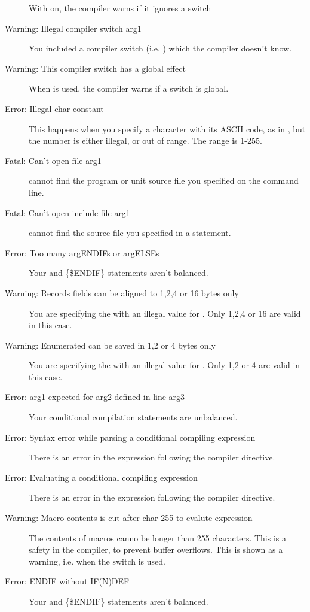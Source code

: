 \begin{description}
 With  on, the compiler warns if it ignores a switch
\item [Warning: Illegal compiler switch arg1]
 You included a compiler switch (i.e. ) which the compiler
 doesn't know.
\item [Warning: This compiler switch has a global effect]
 When  is used, the compiler warns if a switch is global.
\item [Error: Illegal char constant]
 This happens when you specify a character with its ASCII code, as in
 , but the number is either illegal, or out of range. The range
 is 1-255.
\item [Fatal: Can't open file arg1]
 \fpc cannot find the program or unit source file you specified on the
 command line.
\item [Fatal: Can't open include file arg1]
 \fpc cannot find the source file you specified in a 
 statement.
\item [Error: Too many argENDIFs or argELSEs]
 Your  and {\{\$ENDIF\}} statements aren't balanced.
\item [Warning: Records fields can be aligned to 1,2,4 or 16 bytes only]
 You are specifying the  with an illegal value for
 . Only 1,2,4 or 16 are valid in this case.
\item [Warning: Enumerated can be saved in 1,2 or 4 bytes only]
 You are specifying the  with an illegal value for
 . Only 1,2 or 4 are valid in this case.
\item [Error: arg1 expected for arg2 defined in line arg3]
 Your conditional compilation statements are unbalanced.
\item [Error: Syntax error while parsing a conditional compiling expression]
 There is an error in the expression following the  compiler
 directive.
\item [Error: Evaluating a conditional compiling expression]
 There is an error in the expression following the  compiler
 directive.
\item [Warning: Macro contents is cut after char 255 to evalute expression]
 The contents of macros canno be longer than 255 characters. This is a
 safety in the compiler, to prevent buffer overflows. This is shown as a
 warning, i.e. when the  switch is used.
\item [Error: ENDIF without IF(N)DEF]
 Your  and {\{\$ENDIF\}} statements aren't balanced.

\end{description}
